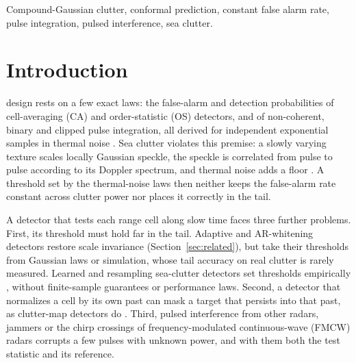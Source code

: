 \documentclass[journal]{IEEEtran}
\begin{document}
\begin{IEEEkeywords}
Compound-Gaussian clutter, conformal prediction, constant false alarm rate, pulse integration, pulsed interference, sea clutter.
\end{IEEEkeywords}

\section{Introduction}
 design rests on a few exact laws: the false-alarm and detection probabilities of cell-averaging (CA) and order-statistic (OS) detectors, and of non-coherent, binary and clipped pulse integration, all derived for independent exponential samples in thermal noise \cite{finn1968,rohling1983,gandhi1988,richards2014,abbasi2018clip}. Sea clutter violates this premise: a slowly varying texture scales locally Gaussian speckle, the speckle is correlated from pulse to pulse according to its Doppler spectrum, and thermal noise adds a floor \cite{ward2013,conte1995,ollila2012}. A threshold set by the thermal-noise laws then neither keeps the false-alarm rate constant across clutter power nor places it correctly in the tail.

A detector that tests each range cell along slow time faces three further problems. First, its threshold must hold far in the tail. Adaptive and AR-whitening detectors restore scale invariance (Section~\ref{sec:related}), but take their thresholds from Gaussian laws or simulation, whose tail accuracy on real clutter is rarely measured. Learned and resampling sea-clutter detectors set thresholds empirically \cite{bai2026cvae,rouzoumka2026ood,qu2023sensors,qu2024sieve,qu2026sact}, without finite-sample guarantees or performance laws. Second, a detector that normalizes a cell by its own past can mask a target that persists into that past, as clutter-map detectors do \cite{lops1989,naldi1999}. Third, pulsed interference from other radars, jammers or the chirp crossings of frequency-modulated continuous-wave (FMCW) radars corrupts a few pulses with unknown power, and with them both the test statistic and its reference.
\end{document}
